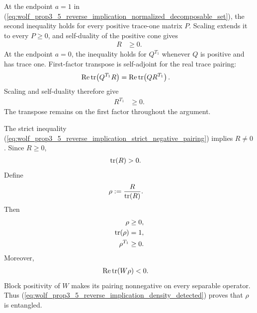 \documentclass{article}
\begin{document}
At the endpoint $a=1$ in
(\ref{eq:wolf_prop3_5_reverse_implication_normalized_decomposable_set}),
the second inequality holds for every positive trace-one matrix $P$. Scaling
extends it to every $P\geq0$, and self-duality of the positive cone gives
\begin{align}
    R
        &\geq0.
    \label{eq:wolf_prop3_5_reverse_implication_separator_positive}
\end{align}
At the endpoint $a=0$, the inequality holds for $Q^{T_1}$ whenever $Q$ is
positive and has trace one. First-factor transpose is self-adjoint for the
real trace pairing:
\begin{align}
    \operatorname{Re}\operatorname{tr}\!\left(Q^{T_1}R\right)
        &=\operatorname{Re}\operatorname{tr}\!\left(QR^{T_1}\right).
    \label{eq:wolf_prop3_5_reverse_implication_transpose_adjointness}
\end{align}
Scaling and self-duality therefore give
\begin{align}
    R^{T_1}
        &\geq0.
    \label{eq:wolf_prop3_5_reverse_implication_separator_ppt}
\end{align}
The transpose remains on the first factor throughout the argument.

The strict inequality
(\ref{eq:wolf_prop3_5_reverse_implication_strict_negative_pairing}) implies
$R\neq0$. Since $R\geq0$,
\begin{align}
    \operatorname{tr}(R)
        &>0.
    \label{eq:wolf_prop3_5_reverse_implication_separator_positive_trace}
\end{align}
Define
\begin{align}
    \rho
        &:=\frac{R}{\operatorname{tr}(R)}.
    \label{eq:wolf_prop3_5_reverse_implication_ppt_density}
\end{align}
Then
\begin{align}
    \rho
        &\geq0,
    \label{eq:wolf_prop3_5_reverse_implication_density_positive}\\
    \operatorname{tr}(\rho)
        &=1,
    \label{eq:wolf_prop3_5_reverse_implication_density_trace}\\
    \rho^{T_1}
        &\geq0.
    \label{eq:wolf_prop3_5_reverse_implication_density_ppt}
\end{align}
Moreover,
\begin{align}
    \operatorname{Re}\operatorname{tr}(W\rho)
        &<0.
    \label{eq:wolf_prop3_5_reverse_implication_density_detected}
\end{align}
Block positivity of $W$ makes its pairing nonnegative on every separable
operator. Thus
(\ref{eq:wolf_prop3_5_reverse_implication_density_detected}) proves that
$\rho$ is entangled.
\end{document}
